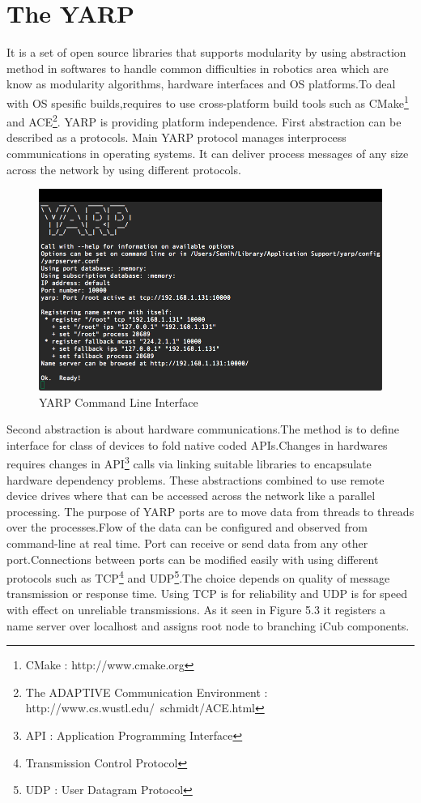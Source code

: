 \documentclass[a4paper, 11pt]{report}
\begin{document}
\section{The YARP}
It is a set of open source libraries that supports modularity by 
using abstraction method in softwares to handle common difficulties in 
robotics area which are know as modularity algorithms, hardware interfaces and 
OS platforms.To deal with OS spesific builds,requires to use cross-platform 
build tools such as CMake\footnote{CMake : http://www.cmake.org} and 
ACE\footnote{The ADAPTIVE Communication Environment :
  http://www.cs.wustl.edu/~schmidt/ACE.html}. YARP is providing platform 
independence. First abstraction can be described as a protocols. Main YARP 
protocol manages interprocess communications in operating systems. It can 
deliver process messages of any size across the network by using different 
protocols.
\begin{figure}[h!]
  \centering
  \includegraphics[width=1.0\linewidth]{yarp}
  \caption{YARP Command Line Interface}
  \label{fig:yarp}
\end{figure}
Second abstraction is about hardware communications.The method is to define 
interface for class of devices to fold native coded APIs.Changes in hardwares 
requires changes in API\footnote{API : Application Programming Interface} calls 
via linking suitable libraries to encapsulate 
hardware dependency problems. These abstractions combined to use remote 
device drives where that can be accessed across the network like a parallel 
processing.
The purpose of YARP ports are to move data from threads to threads over the 
processes.Flow of the data can be configured and observed from command-line 
at real time. Port can receive or send data from any other port.Connections 
between ports can be modified easily with using different protocols such as 
TCP\footnote{Transmission Control Protocol} and UDP\footnote{UDP : User 
Datagram Protocol}.The choice depends on quality of message transmission or 
response 
time. Using TCP is for reliability and UDP is for speed with effect on 
unreliable transmissions. As it seen in Figure 5.3 it registers a name server 
over localhost and assigns root node to branching iCub components.
\end{document}
